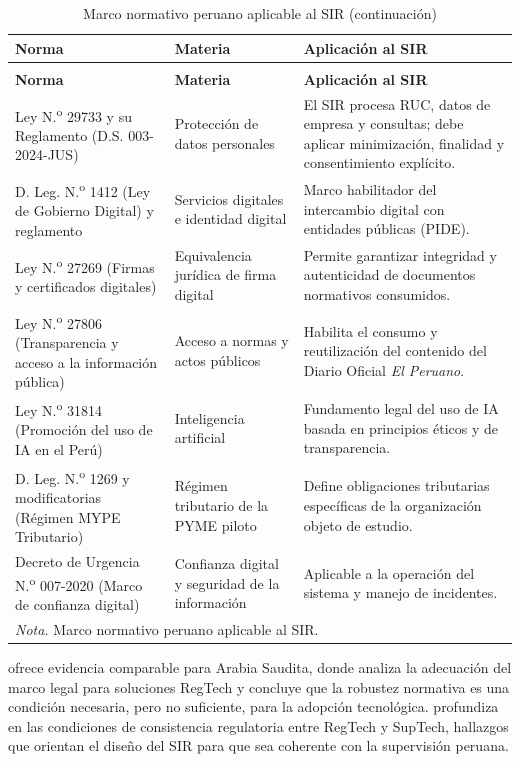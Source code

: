 \documentclass[12pt,a4paper,oneside]{report}
\begin{document}
\begin{longtable}{@{}p{}p{}p{}@{}}
\caption{Marco normativo peruano aplicable al SIR}\label{tab:marco-normativo-peruano-sir}\\
\toprule
\textbf{Norma} & \textbf{Materia} & \textbf{Aplicación al SIR} \\
\midrule
\endfirsthead
\caption[]{Marco normativo peruano aplicable al SIR (continuación)}\\
\toprule
\textbf{Norma} & \textbf{Materia} & \textbf{Aplicación al SIR} \\
\midrule
\endhead
Ley N.\textsuperscript{o} 29733 y su Reglamento (D.S. 003-2024-JUS) & Protección de datos personales & El SIR procesa RUC, datos de empresa y consultas; debe aplicar minimización, finalidad y consentimiento explícito. \\
D. Leg. N.\textsuperscript{o} 1412 (Ley de Gobierno Digital) y reglamento & Servicios digitales e identidad digital & Marco habilitador del intercambio digital con entidades públicas (PIDE). \\
Ley N.\textsuperscript{o} 27269 (Firmas y certificados digitales) & Equivalencia jurídica de firma digital & Permite garantizar integridad y autenticidad de documentos normativos consumidos. \\
Ley N.\textsuperscript{o} 27806 (Transparencia y acceso a la información pública) & Acceso a normas y actos públicos & Habilita el consumo y reutilización del contenido del Diario Oficial \textit{El Peruano}. \\
Ley N.\textsuperscript{o} 31814 (Promoción del uso de IA en el Perú) & Inteligencia artificial & Fundamento legal del uso de IA basada en principios éticos y de transparencia. \\
D. Leg. N.\textsuperscript{o} 1269 y modificatorias (Régimen MYPE Tributario) & Régimen tributario de la PYME piloto & Define obligaciones tributarias específicas de la organización objeto de estudio. \\
Decreto de Urgencia N.\textsuperscript{o} 007-2020 (Marco de confianza digital) & Confianza digital y seguridad de la información & Aplicable a la operación del sistema y manejo de incidentes. \\
\bottomrule
\multicolumn{3}{p{0.96\textwidth}}{\normalsize \textit{Nota.} Marco normativo peruano aplicable al SIR.}\\
\end{longtable}

\textcite{sarabdeen2023} ofrece evidencia comparable para Arabia Saudita, donde analiza la adecuación del marco legal para soluciones RegTech y concluye que la robustez normativa es una condición necesaria, pero no suficiente, para la adopción tecnológica. \textcite{mccarthy2023} profundiza en las condiciones de consistencia regulatoria entre RegTech y SupTech, hallazgos que orientan el diseño del SIR para que sea coherente con la supervisión peruana.
\end{document}

